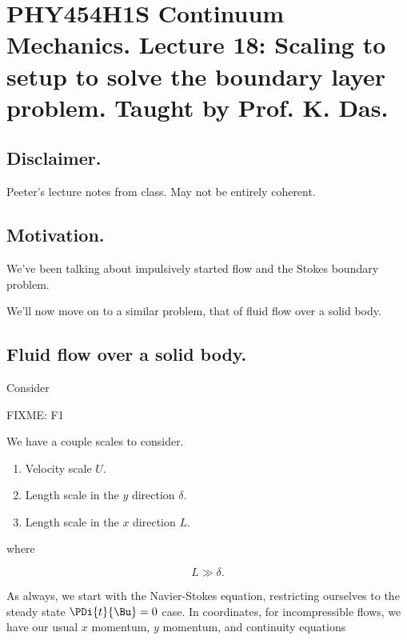 
%

\chapter{PHY454H1S Continuum Mechanics.  Lecture 18: Scaling to setup to solve the boundary layer problem.  Taught by Prof. K. Das.}
\label{chap:continuumL18}
{}
\date{Mar 21, 2012}

\beginArtWithToc

\section{Disclaimer.}

Peeter's lecture notes from class.  May not be entirely coherent.

\section{Motivation.}

We've been talking about impulsively started flow and the Stokes boundary problem.

We'll now move on to a similar problem, that of fluid flow over a solid body.

\section{Fluid flow over a solid body.}

Consider 

FIXME: F1

We have a couple scales to consider.

\begin{enumerate}
\item Velocity scale $U$.
\item Length scale in the $y$ direction $\delta$.
\item Length scale in the $x$ direction $L$.
\end{enumerate}

where

\begin{equation}\label{eqn:continuumL18:10}
L \gg \delta.
\end{equation}

As always, we start with the Navier-Stokes equation, restricting ourselves to the steady state $\PDi{t}{\Bu} = 0$ case.  In coordinates, for incompressible flows, we have our usual $x$ momentum, $y$ momentum, and continuity equations

